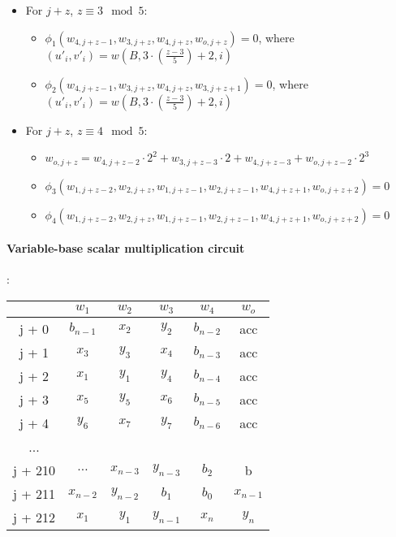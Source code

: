 \begin{itemize}
\begin{itemize}
	\end{itemize}
	\item For $j + z$, $z \equiv 3 \mod 5$:
	\begin{itemize}
		\item $\phi_1(w_{4, j + z - 1}, w_{3, j + z}, w_{4, j + z}, w_{o, j + z}) = 0$, where $(u'_{i}, v'_{i}) = w(B, 3 \cdot (\frac{z - 3}{5}) + 2, i)$
		\item $\phi_2(w_{4, j + z - 1}, w_{3, j + z}, w_{4, j + z}, w_{3, j + z + 1}) = 0$, where $(u'_{i}, v'_{i}) = w(B, 3 \cdot (\frac{z - 3}{5}) + 2, i)$
	\end{itemize}
	\item For $j + z$, $z \equiv 4 \mod 5$:
	\begin{itemize}
		\item $w_{o, j + z} = w_{4,j + z - 2} \cdot 2^2 + w_{3,j + z - 3} \cdot 2 + w_{4, j + z - 3} + w_{o, j + z - 2} \cdot 2^3$
		\item $\phi_3(w_{1, j + z - 2}, w_{2, j + z}, w_{1, j + z - 1}, w_{2, j + z - 1}, w_{4, j + z + 1}, w_{o, j + z + 2}) = 0$
		\item $\phi_4(w_{1, j + z - 2}, w_{2, j + z}, w_{1, j + z - 1}, w_{2, j + z - 1}, w_{4, j + z + 1}, w_{o, j + z + 2}) = 0$
	\end{itemize}
\end{itemize}

\paragraph{Variable-base scalar multiplication circuit}:
\begin{center}
\begin{tabular}{ c|c|c|c|c|c } 
  & $w_1$ & $w_2$ & $w_3$ & $w_4$ & $w_o$\\ 
 \hline
j + 0 & $b_{n - 1}$ & $x_2$ & $y_2$ & $b_{n - 2}$ & acc\\ 
j + 1 & $x_3$ & $ y_3$ & $x_4$ & $b_{n - 3}$ & acc\\ 
j + 2 & $x_1$ & $ y_1$ & $y_4$ & $b_{n - 4}$ & acc\\ 
j + 3 & $x_5$ & $y_5$ & $x_6$ & $b_{n - 5}$ & acc \\ 
j + 4 & $y_6$ & $ x_7$ & $y_7$ & $b_{n - 6}$ & acc\\
... & & & & &\\ 
j + 210 & $\dots$  & $x_{n-3}$ & $y_{n-3}$ & $b_2$ & b\\ 
j + 211 & $x_{n-2}$ & $ y_{n-2}$ & $b_1$ & $b_0$ & $x_{n-1}$\\ 
j + 212 & $x_1$ & $ y_1$ & $y_{n-1}$ & $x_n$ & $y_n$ \\ 
\end{tabular}
\end{center}

